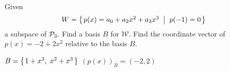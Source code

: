 
\begin{Exercise}[
name={},
title={}, 
difficulty=0,
origin={\cite{YL}}]
Given \[W=\mbox{$\left\{\hspace{0.1em}p(x)=a_0+a_2x^2+a_3x^3 \;\;\middle|\;\; p(-1)=0 \hspace{0.1em}\right\}$}\] a subspace of $\mathcal{P}_3$.
\Question Find a basis $B$ for $\mathcal{W}$.
\Question Find the coordinate vector of $p(x)=-2+2x^2$ relative to the basis $B$.



\end{Exercise}

\begin{Answer}
\Question $B=\mbox{$\left\{\hspace{0.1em}1+x^3,\;x^2+x^3\hspace{0.1em}\right\}$}$
\Question $(p(x))_B = (-2, 2)$
\end{Answer}
